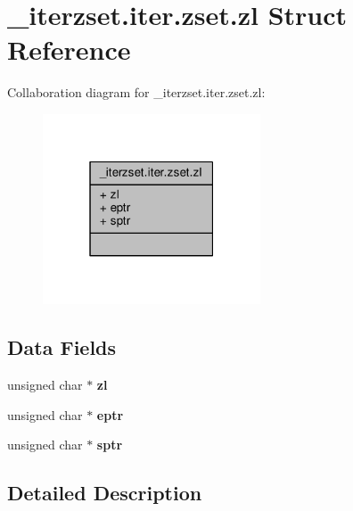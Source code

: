 \hypertarget{structzsetopsrc_1_1__iterzset_8iter_8zset_8zl}{}\section{\+\_\+iterzset.\+iter.\+zset.\+zl Struct Reference}
\label{structzsetopsrc_1_1__iterzset_8iter_8zset_8zl}


Collaboration diagram for \+\_\+iterzset.\+iter.\+zset.\+zl\+:\nopagebreak
\begin{figure}[H]
\begin{center}
\leavevmode
\includegraphics[width=183pt]{structzsetopsrc_1_1__iterzset_8iter_8zset_8zl__coll__graph}
\end{center}
\end{figure}
\subsection*{Data Fields}
\begin{DoxyCompactItemize}
\item 
\mbox{\label{structzsetopsrc_1_1__iterzset_8iter_8zset_8zl_ac28cbd398a61e9022fd6a6835a57dc50}} 
unsigned char $\ast$ {\bfseries zl}
\item 
\mbox{\label{structzsetopsrc_1_1__iterzset_8iter_8zset_8zl_afac7b97084c84e109b45fe4ac53a63c0}} 
unsigned char $\ast$ {\bfseries eptr}
\item 
\mbox{\label{structzsetopsrc_1_1__iterzset_8iter_8zset_8zl_aa6769fcc80318f1732ac9dbf2bc2511d}} 
unsigned char $\ast$ {\bfseries sptr}
\end{DoxyCompactItemize}


\subsection{Detailed Description}


